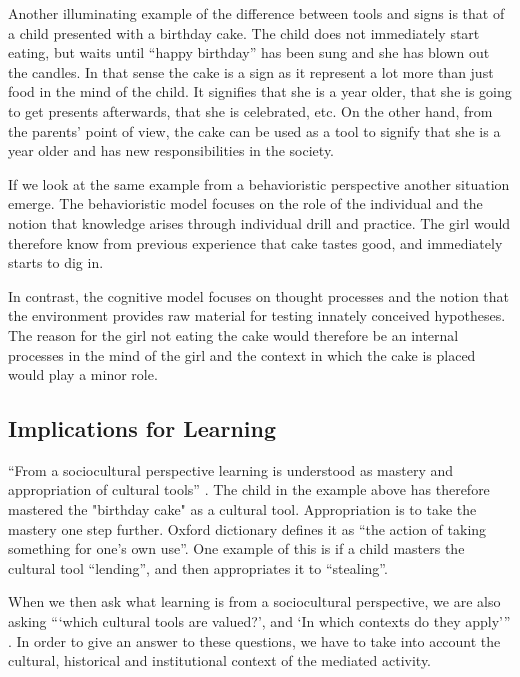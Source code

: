 Another illuminating example of the difference between tools and signs is that of a child presented with a birthday cake. The child does not immediately start eating, but waits until “happy birthday” has been sung and she has blown out the candles. In that sense the cake is a sign as it represent a lot more than just food in the mind of the child. It signifies that she is a year older, that she is going to get presents afterwards, that she is celebrated, etc. On the other hand, from the parents’ point of view, the cake can be used as a tool to signify that she is a year older and has new responsibilities in the society. 

If we look at the same example from a behavioristic perspective another situation emerge. The behavioristic model focuses on the role of the individual and the notion that knowledge arises through individual drill and practice. The girl would therefore know from previous experience that cake tastes good, and immediately starts to dig in. 

In contrast, the cognitive model focuses on thought processes and the notion that the environment provides raw material for testing innately conceived hypotheses. The reason for the girl not eating the cake would therefore be an internal processes in the mind of the girl and the context in which the cake is placed would play a minor role. 

\subsection{Implications for Learning}
“From a sociocultural perspective learning is understood as mastery and appropriation of cultural tools” \citetext{Wertsch, 1998, Säljö, 1999, 2001, cited in \citealp{mifsud2010reconsidering}}. The child in the example above has therefore mastered the "birthday cake" as a cultural tool. Appropriation is to take the mastery one step further. Oxford dictionary defines it as “the action of taking something for one’s own use”. One example of this is if a child masters the cultural tool “lending”, and then appropriates it to “stealing”. 

When we then ask what learning is from a sociocultural perspective, we are also asking “‘which cultural tools are valued?’, and ‘In which contexts do they apply’” \citep{mifsud2010reconsidering}. In order to give an answer to these questions, we have to take into account the cultural, historical and institutional context of the mediated activity. 


